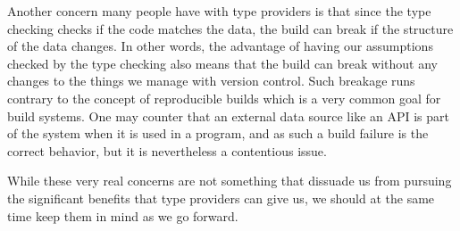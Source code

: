 Another concern many people have with type providers is that since the type checking checks if the code matches the data, the build can break if the structure of the data changes. In other words, the advantage of having our assumptions checked by the type checking also means that the build can break without any changes to the things we manage with version control. Such breakage runs contrary to the concept of reproducible builds which is a very common goal for build systems. One may counter that an external data source like an API is part of the system when it is used in a program, and as such a build failure is the correct behavior, but it is nevertheless a contentious issue.

While these very real concerns are not something that dissuade us from pursuing the significant benefits that type providers can give us, we should at the same time keep them in mind as we go forward.
